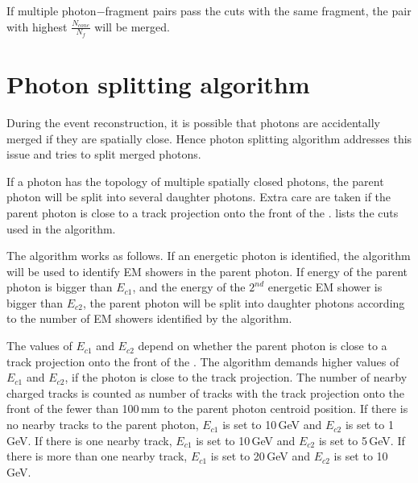 If multiple photon$-$fragment pairs pass the cuts with the same fragment, the pair with highest $\frac{N_{cone}}{N_f}$ will be merged.



\section{Photon splitting algorithm}
\label{sec:photonSplitting}



During the event reconstruction, it is possible that photons are accidentally merged if they are spatially close. Hence photon splitting  algorithm  addresses this issue and tries to split merged photons.

If a photon has the  topology of multiple spatially closed photons, the parent photon will be split into several daughter photons. Extra care are taken if the parent photon is close to a track projection onto the front of the \ECAL.  lists the cuts used in the algorithm.

The algorithm works as follows. If an energetic photon is identified, the \peakFinding algorithm will  be used to identify EM showers in the parent photon. If energy of the parent photon is bigger than $E_{c1}$, and the energy of the $2^{nd}$ energetic EM shower is bigger than $E_{c2}$, the parent photon will be split into daughter photons according to the number of EM showers identified by the \peakFinding algorithm.

The values of $E_{c1}$ and $E_{c2}$ depend on whether the parent photon is close to a track projection onto the front of the \ECAL. The algorithm demands  higher values of $E_{c1}$ and   $E_{c2}$, if the photon is close to the track projection. The number of nearby charged tracks is counted as number of tracks with the track projection onto the front of the \ECAL fewer than 100\,mm to the parent photon centroid position. If there is no nearby tracks to the parent photon, $E_{c1}$ is set to 10\,GeV and $E_{c2}$ is set to 1\,GeV. If there is one nearby track, $E_{c1}$ is set to 10\,GeV and $E_{c2}$ is set to 5\,GeV. If there is more than one nearby track, $E_{c1}$ is set to 20\,GeV and $E_{c2}$ is set to 10\,GeV.


